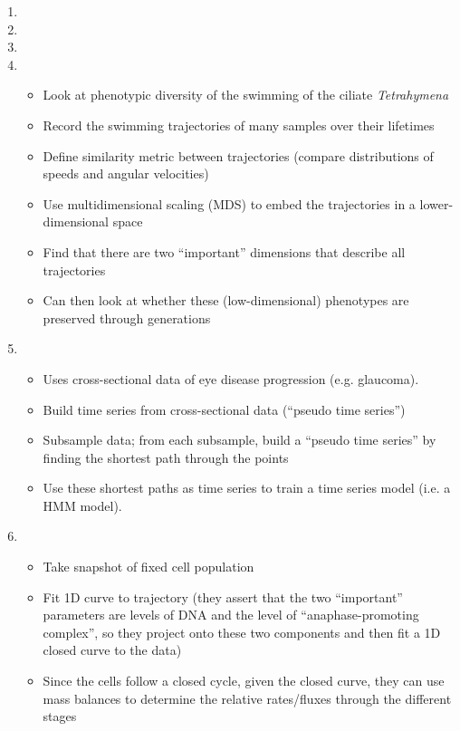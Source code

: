 \documentclass[12pt]{article}
\begin{document}
\begin{enumerate}

\item {}

\item {}

\item {}

\item {}
\begin{itemize}
	\item Look at phenotypic diversity of the swimming of the ciliate {\em Tetrahymena}
	\item Record the swimming trajectories of many samples over their lifetimes
	\item Define similarity metric between trajectories (compare distributions of speeds and angular velocities)
	\item Use multidimensional scaling (MDS) to embed the trajectories in a lower-dimensional space
	\item Find that there are two ``important'' dimensions that describe all trajectories
	\item Can then look at whether these (low-dimensional) phenotypes are preserved through generations
\end{itemize}

\item {}
\begin{itemize}
	\item Uses cross-sectional data of eye disease progression (e.g. glaucoma).
	\item Build time series from cross-sectional data (``pseudo time series'')
	\item Subsample data; from each subsample, build a ``pseudo time series'' by finding the shortest path through the points
	\item Use these shortest paths as time series to train a time series model (i.e. a HMM model).
\end{itemize}

\item {}
\begin{itemize}
	\item Take snapshot of fixed cell population
	\item Fit 1D curve to trajectory (they assert that the two ``important'' parameters are levels of DNA and the level of ``anaphase-promoting complex'', so they project onto these two components and then fit a 1D closed curve to the data)
	\item Since the cells follow a closed cycle, given the closed curve, they can use mass balances to determine the relative rates/fluxes through the different stages
\end{itemize}


\end{enumerate}
\end{document}
